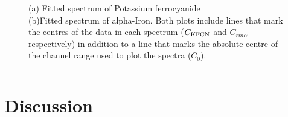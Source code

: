 \documentclass[a4paper, twocolumn]{article}
\begin{document}
\begin{figure}[!htbp]
\centering
{}
\caption{(a) Fitted spectrum of Potassium ferrocyanide\\ 
(b)Fitted spectrum of alpha-Iron. Both plots include lines that mark the centres of the data in each spectrum ($C_{\rm KFCN}$ and $C_{rm \alpha}$ respectively) in addition to a line that marks the absolute centre of the channel range used to plot the spectra ($C_0$).
}
\end{figure}

\begin{equation} 
\end{equation}

\clearpage
\twocolumn

\section{Discussion}
\end{document}
